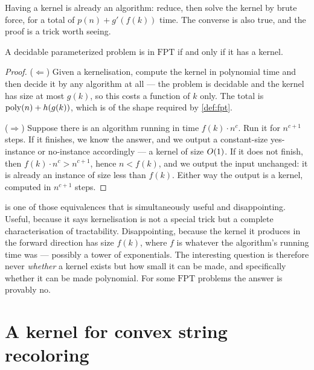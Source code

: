 Having a kernel is already an algorithm: reduce, then solve the kernel by brute
force, for a total of $p(n) + g'(f(k))$ time. The converse is also true, and
the proof is a trick worth seeing.

\begin{theorem}\label{thm:kernel-iff-fpt}
A decidable parameterized problem is in $\mathrm{FPT}$ if and only if it has a
kernel.
\end{theorem}

\begin{proof}
($\Leftarrow$) Given a kernelisation, compute the kernel in polynomial time and
then decide it by any algorithm at all --- the problem is decidable and the
kernel has size at most $g(k)$, so this costs a function of $k$ only. The total
is $\mathrm{poly}(n) + h(g(k))$, which is of the shape required by \cref{def:fpt}.

($\Rightarrow$) Suppose there is an algorithm running in time $f(k)\cdot n^{c}$.
Run it for $n^{c+1}$ steps. If it finishes, we know the answer, and we output a
constant-size yes-instance or no-instance accordingly --- a kernel of size
$O\!\left(1\right)$. If it does not finish, then $f(k)\cdot n^{c} > n^{c+1}$, hence
$n < f(k)$, and we output the input unchanged: it is already an instance of size
less than $f(k)$. Either way the output is a kernel, computed in $n^{c+1}$
steps.
\end{proof}

\begin{intuition}
 is one of those equivalences that is simultaneously
useful and disappointing. Useful, because it says kernelisation is not a
special trick but a complete characterisation of tractability. Disappointing,
because the kernel it produces in the forward direction has size $f(k)$, where
$f$ is whatever the algorithm's running time was --- possibly a tower of
exponentials. The interesting question is therefore never \emph{whether} a
kernel exists but how small it can be made, and specifically whether it can be
made polynomial. For some $\mathrm{FPT}$ problems the answer is provably no.
\end{intuition}

\section{A kernel for convex string recoloring}
\label{sec:fpt-convex-kernel}

